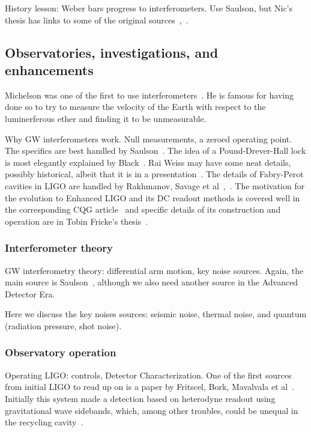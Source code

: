             History lesson: Weber bars progress to interferometers. Use Saulson, but Nic's thesis has links to some of the original sources~\cite{Saulson},~\cite{SmithThesis}.           

        \subsection{Observatories, investigations, and enhancements}
        \label{methods}

		Michelson was one of the first to use interferometers~\cite{michelson}. He is famous for having done so to try to measure the velocity of the Earth with respect to the luminerferous ether and finding it to be unmeasurable.

            Why GW interferometers work. Null measurements, a zeroed operating point. The specifics are best handled by Saulson~\cite{Saulson}. The idea of a Pound-Drever-Hall lock is most elegantly explained by Black~\cite{PDHNotes}. Rai Weiss may have some neat details, possibly historical, albeit that it is in a presentation~\cite{LIGOWorks}. The details of Fabry-Perot cavities in LIGO are handled by Rakhmanov, Savage et al~\cite{ResonanceFP},~\cite{ResponsesFP}. The motivation for the evolution to Enhanced LIGO and its DC readout methods is covered well in the corresponding CQG article~\cite{Fricke2009} and specific details of its construction and operation are in Tobin Fricke's thesis~\cite{FrickeThesis}.

            \subsubsection{Interferometer theory}
            \label{interferometer_theory}
        
                GW interferometry theory: differential arm motion, key noise sources. Again, the main source is Saulson~\cite{Saulson}, although we also need another source in the Advanced Detector Era.

                Here we discuss the key noises sources: seismic noise, thermal noise, and quantum (radiation pressure, shot noise).

            \subsubsection{Observatory operation}
            \label{observatory_operation}

                Operating LIGO: controls, Detector Characterization. One of the first sources from initial LIGO to read up on is a paper by Fritscel, Bork, Mavalvala et al~\cite{ReadoutGWA}. Initially this system made a detection based on heterodyne readout using gravitational wave sidebands, which, among other troubles, could be unequal in the recycling cavity~\cite{MeadorsHanford2005}.

